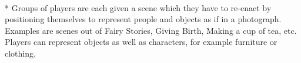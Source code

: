 \begin{minipage}{\textwidth}
\\*
Groups of players are each given a scene which they have to re-enact by positioning themselves to represent people and objects as if in a photograph.  Examples are scenes out of Fairy Stories, Giving Birth, Making a cup of tea, etc.  Players can represent objects as well as characters, for example furniture or clothing.
\end{minipage}    \vfill
